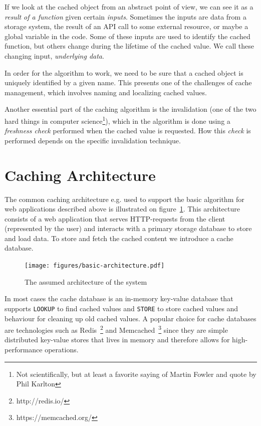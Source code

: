 If we look at the cached object from an abstract point of view, we can see it as a \emph{result of a function} given certain \emph{inputs}. Sometimes the inputs are data from a storage system, the result of an API call to some external resource, or maybe a global variable in the code. Some of these inputs are used to identify the cached function, but others change during the lifetime of the cached value. We call these changing input, \emph{underlying data}.

In order for the algorithm to work, we need to be sure that a cached object is uniquely identified by a given name. This presents one of the challenges of cache management, which involves naming and localizing cached values.

Another essential part of the caching algorithm is the invalidation (one of the two hard things in computer science\footnote{Not scientifically, but at least a favorite saying of Martin Fowler and quote by Phil Karlton}), which in the algorithm is done using a \emph{freshness check} performed when the cached value is requested. How this \emph{check} is performed depends on the specific invalidation technique.

\section{Caching Architecture}
\label{subsec:architecture}

The common caching architecture e.g. used to support the basic algorithm for web applications described above is illustrated on figure~\ref{fig:caching-basics-architecture}. This architecture consists of a web application that serves HTTP-requests from the client (represented by the user) and interacts with a primary storage database to store and load data. To store and fetch the cached content we introduce a cache database.

\begin{figure}[ht!]
  \centering
  \texttt{[image: figures/basic-architecture.pdf]}
  \caption{The assumed architecture of the system}
  \label{fig:caching-basics-architecture}
\end{figure}

In most cases the cache database is an in-memory key-value database that supports \verb$LOOKUP$ to find cached values and \verb$STORE$ to store cached values and behaviour for cleaning up old cached values. A popular choice for cache databases are technologies such as Redis~\footnote{http://redis.io/} and Memcached~\footnote{https://memcached.org/} since they are simple distributed key-value stores that lives in memory and therefore allows for high-performance operations.

